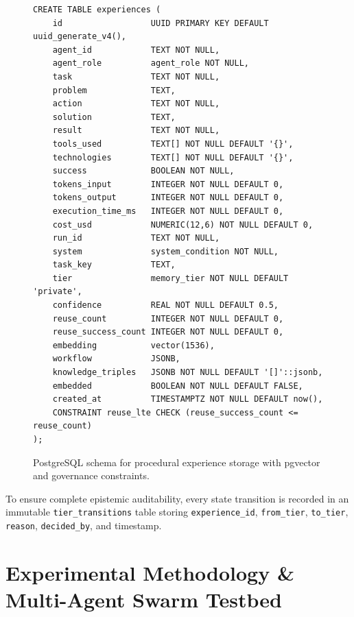 \documentclass[lettersize,journal]{IEEEtran}
\begin{document}
\begin{figure}[!t]
\begin{minipage}{\columnwidth}
\begin{scriptsize}
\begin{verbatim}
CREATE TABLE experiences (
    id                  UUID PRIMARY KEY DEFAULT uuid_generate_v4(),
    agent_id            TEXT NOT NULL,
    agent_role          agent_role NOT NULL,
    task                TEXT NOT NULL,
    problem             TEXT,
    action              TEXT NOT NULL,
    solution            TEXT,
    result              TEXT NOT NULL,
    tools_used          TEXT[] NOT NULL DEFAULT '{}',
    technologies        TEXT[] NOT NULL DEFAULT '{}',
    success             BOOLEAN NOT NULL,
    tokens_input        INTEGER NOT NULL DEFAULT 0,
    tokens_output       INTEGER NOT NULL DEFAULT 0,
    execution_time_ms   INTEGER NOT NULL DEFAULT 0,
    cost_usd            NUMERIC(12,6) NOT NULL DEFAULT 0,
    run_id              TEXT NOT NULL,
    system              system_condition NOT NULL,
    task_key            TEXT,
    tier                memory_tier NOT NULL DEFAULT 'private',
    confidence          REAL NOT NULL DEFAULT 0.5,
    reuse_count         INTEGER NOT NULL DEFAULT 0,
    reuse_success_count INTEGER NOT NULL DEFAULT 0,
    embedding           vector(1536),
    workflow            JSONB,
    knowledge_triples   JSONB NOT NULL DEFAULT '[]'::jsonb,
    embedded            BOOLEAN NOT NULL DEFAULT FALSE,
    created_at          TIMESTAMPTZ NOT NULL DEFAULT now(),
    CONSTRAINT reuse_lte CHECK (reuse_success_count <= reuse_count)
);
\end{verbatim}
\end{scriptsize}
\end{minipage}
\caption{PostgreSQL schema for procedural experience storage with pgvector and governance constraints.}
\label{lst:schema}
\end{figure}

To ensure complete epistemic auditability, every state transition is recorded in an immutable \texttt{tier\_transitions} table storing \texttt{experience\_id}, \texttt{from\_tier}, \texttt{to\_tier}, \texttt{reason}, \texttt{decided\_by}, and timestamp.

\section{Experimental Methodology \& Multi-Agent Swarm Testbed}
\end{document}
